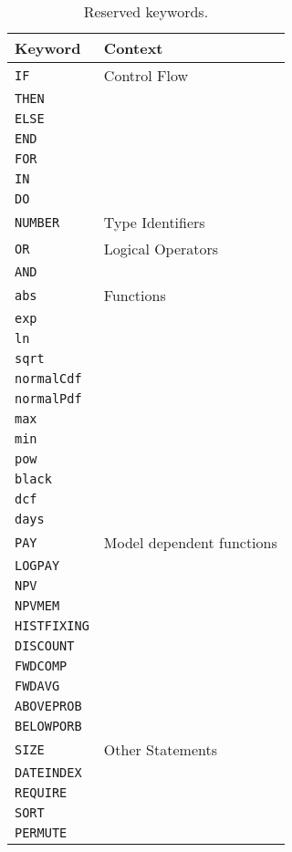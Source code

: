 \begin{table}[!htbp]
  \begin{tabular}{l | l}
    Keyword & Context\\ \hline
    \verb+IF+ & Control Flow \\
    \verb+THEN+ & \\
    \verb+ELSE+ & \\
    \verb+END+ & \\
    \verb+FOR+ & \\
    \verb+IN+ & \\
    \verb+DO+ & \\ \hline
    \verb+NUMBER+ & Type Identifiers \\ \hline
    \verb+OR+ & Logical Operators \\
    \verb+AND+ & \\ \hline
    \verb+abs+ & Functions\\
    \verb+exp+ & \\
    \verb+ln+ & \\
    \verb+sqrt+ & \\
    \verb+normalCdf+ & \\
    \verb+normalPdf+ & \\
    \verb+max+ & \\
    \verb+min+ & \\
    \verb+pow+ & \\
    \verb+black+ & \\
    \verb+dcf+ & \\
    \verb+days+ & \\ \hline
    \verb+PAY+ & Model dependent functions\\
    \verb+LOGPAY+ & \\
    \verb+NPV+ & \\
    \verb+NPVMEM+ & \\
    \verb+HISTFIXING+ & \\
    \verb+DISCOUNT+ & \\
    \verb+FWDCOMP+ & \\
    \verb+FWDAVG+ & \\
    \verb+ABOVEPROB+ & \\
    \verb+BELOWPORB+ & \\ \hline
    \verb+SIZE+ & Other Statements \\
    \verb+DATEINDEX+ & \\
    \verb+REQUIRE+ & \\
    \verb+SORT+ & \\
    \verb+PERMUTE+ & \\
  \end{tabular}
  \caption{Reserved keywords.}
  \label{tab:keywords}
\end{table}

